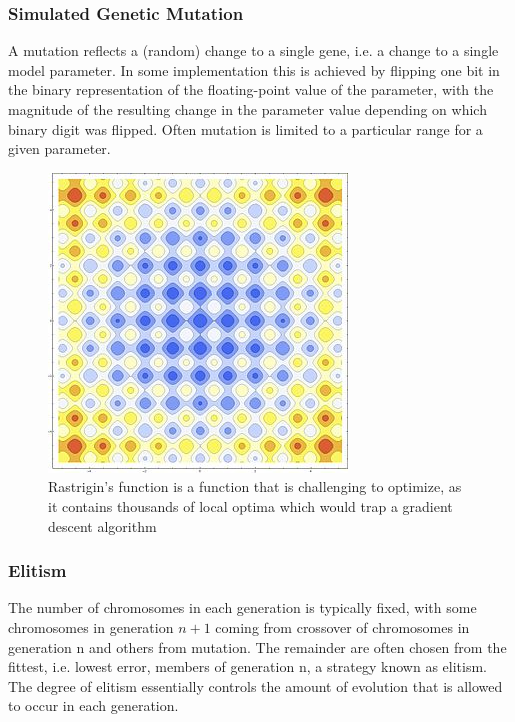 \subsubsection{Simulated Genetic Mutation}
A mutation reflects a (random) change to a single gene, i.e. a change to a single model parameter.  In some implementation this is achieved by flipping one bit in the binary representation of the floating-point value of the parameter, with the magnitude of the resulting change in the parameter value depending on which binary digit was flipped.  Often mutation is limited to a particular range for a given parameter.
\begin{figure}
\begin{center}

\includegraphics[scale=0.5]{figures/rastagrind}
\caption{Rastrigin's function is a function that is challenging to optimize, as it contains thousands of local optima which would trap a gradient descent algorithm \cite{rastrigin1974systems}}
\end{center}

\end{figure}

\subsubsection{Elitism}
The number of chromosomes in each generation is typically fixed, with some chromosomes in generation $n+1$ coming from crossover of chromosomes in generation n and others from mutation.
The remainder are often chosen from the fittest, i.e. lowest error, members of generation n, a strategy known as elitism.
The degree of elitism essentially controls the amount of evolution that is allowed to occur in each generation.

